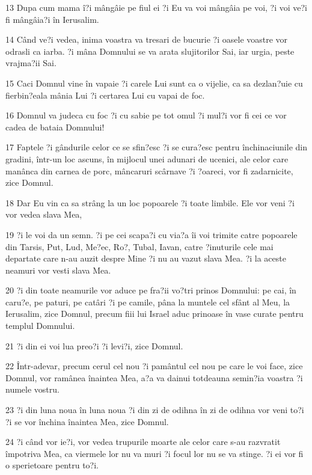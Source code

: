 \par 13 Dupa cum mama î?i mângâie pe fiul ei ?i Eu va voi mângâia pe voi, ?i voi ve?i fi mângâia?i în Ierusalim.
\par 14 Când ve?i vedea, inima voastra va tresari de bucurie ?i oasele voastre vor odrasli ca iarba. ?i mâna Domnului se va arata slujitorilor Sai, iar urgia, peste vrajma?ii Sai.
\par 15 Caci Domnul vine în vapaie ?i carele Lui sunt ca o vijelie, ca sa dezlan?uie cu fierbin?eala mânia Lui ?i certarea Lui cu vapai de foc.
\par 16 Domnul va judeca cu foc ?i cu sabie pe tot omul ?i mul?i vor fi cei ce vor cadea de bataia Domnului!
\par 17 Faptele ?i gândurile celor ce se sfin?esc ?i se cura?esc pentru închinaciunile din gradini, într-un loc ascuns, în mijlocul unei adunari de ucenici, ale celor care manânca din carnea de porc, mâncaruri scârnave ?i ?oareci, vor fi zadarnicite, zice Domnul.
\par 18 Dar Eu vin ca sa strâng la un loc popoarele ?i toate limbile. Ele vor veni ?i vor vedea slava Mea,
\par 19 ?i le voi da un semn. ?i pe cei scapa?i cu via?a îi voi trimite catre popoarele din Tarsis, Put, Lud, Me?ec, Ro?, Tubal, Iavan, catre ?inuturile cele mai departate care n-au auzit despre Mine ?i nu au vazut slava Mea. ?i la aceste neamuri vor vesti slava Mea.
\par 20 ?i din toate neamurile vor aduce pe fra?ii vo?tri prinos Domnului: pe cai, în caru?e, pe paturi, pe catâri ?i pe camile, pâna la muntele cel sfânt al Meu, la Ierusalim, zice Domnul, precum fiii lui Israel aduc prinoase în vase curate pentru templul Domnului.
\par 21 ?i din ei voi lua preo?i ?i levi?i, zice Domnul.
\par 22 Într-adevar, precum cerul cel nou ?i pamântul cel nou pe care le voi face, zice Domnul, vor ramânea înaintea Mea, a?a va dainui totdeauna semin?ia voastra ?i numele vostru.
\par 23 ?i din luna noua în luna noua ?i din zi de odihna în zi de odihna vor veni to?i ?i se vor închina înaintea Mea, zice Domnul.
\par 24 ?i când vor ie?i, vor vedea trupurile moarte ale celor care s-au razvratit împotriva Mea, ca viermele lor nu va muri ?i focul lor nu se va stinge. ?i ei vor fi o sperietoare pentru to?i.


